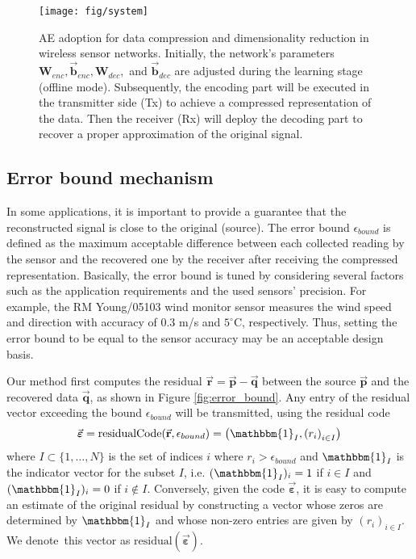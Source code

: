 \documentclass[a4paper,onecolumn,conference]{IEEEtran}
\begin{document}
\begin{figure}
\begin{centering}
\texttt{[image: fig/system]}
\par\end{centering}

\caption{\label{fig:autoencoder_adoption}AE adoption for data compression and dimensionality reduction in wireless sensor networks. Initially, the network's parameters $\mathbf{W}_{enc},\vec{\mathbf{b}}_{enc},\mathbf{W}_{dec},$ and $\vec{\mathbf{b}}_{dec}$ are adjusted during the learning stage (offline mode). Subsequently, the encoding part will be executed in the transmitter side (Tx) to achieve a compressed representation of the data. Then the receiver (Rx) will deploy the decoding part to recover a proper approximation of the original signal.}
\end{figure}

\subsection{Error bound mechanism}
In some applications, it is important to provide a guarantee that the reconstructed signal is close to the original (source). The error bound $\epsilon_{bound}$ is defined as the maximum acceptable difference between each collected reading by the sensor and the recovered one by the receiver after receiving the compressed representation. Basically, the error bound is tuned by considering several factors such as the application requirements and the used sensors' precision. For example, the RM Young/05103 wind monitor sensor \cite{rm_young05103} measures the wind speed and direction with accuracy of 0.3 m/s and $5^{\circ}\text{C}$, respectively. Thus, setting
the error bound to be equal to the sensor accuracy may be an acceptable design basis.

Our method first computes the residual $\vec{\mathbf{r}} = \vec{\mathbf{p}}-\vec{\mathbf{q}}$ between the source $\vec{\mathbf{p}}$ and the recovered data $\vec{\mathbf{q}}$, as shown in Figure \ref{fig:error_bound}. Any entry of the residual vector exceeding the bound $\epsilon_{bound}$ will be transmitted, using the residual code
\begin{equation}
\vec{\boldsymbol{\varepsilon}}=\text{residualCode}(\vec{\mathbf{r}}, \epsilon_{bound})=\left(\mathbbm{1}_{I}, \left(r_{i}\right)_{i\in I}\right)
\end{equation}
where $I \subset \{1, \ldots, N\}$ is the set of indices $i$ where $r_{i}>\epsilon_{bound}$ and $\mathbbm{1}_{I}$ is the indicator vector for the subset $I$, i.e. $(\mathbbm{1}_{I})_i = 1$ if $i \in I$ and $(\mathbbm{1}_{I})_i = 0$ if $i \notin I$. Conversely, given the code $\vec{\boldsymbol{\varepsilon}}$, it is easy to compute an estimate of the original residual by constructing a vector whose zeros are determined by $\mathbbm{1}_{I}$ and whose non-zero entries are given by $\left(r_{i}\right)_{i\in I}$. We denote~this vector as $\mbox{residual}(\vec{\boldsymbol{\varepsilon}})$.
\end{document}
